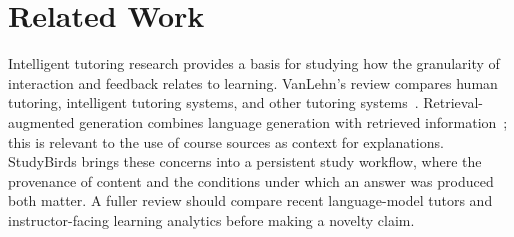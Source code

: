 \section{Related Work}
\label{sec:related}

Intelligent tutoring research provides a basis for studying how the
granularity of interaction and feedback relates to learning. VanLehn's
review compares human tutoring, intelligent tutoring systems, and other
tutoring systems~\cite{vanlehn2011tutoring}. Retrieval-augmented
generation combines language generation with retrieved
information~\cite{lewis2020rag}; this is relevant to the use of course
sources as context for explanations. StudyBirds brings these concerns
into a persistent study workflow, where the provenance of content and the
conditions under which an answer was produced both matter. A fuller
review should compare recent language-model tutors and instructor-facing
learning analytics before making a novelty claim.
